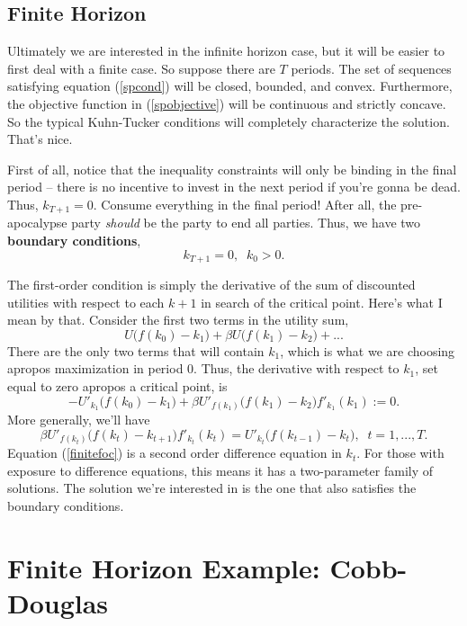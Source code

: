 \documentclass[12pt]{article}
\theoremstyle{definition}
\begin{document}
\subsection{Finite Horizon} 

Ultimately we are interested in the infinite horizon case, but it will be easier to first deal with a finite case. So suppose there are $T$ periods. 
The set of sequences satisfying equation (\ref{spcond}) will be closed, bounded, and convex. Furthermore, the objective function in (\ref{spobjective}) will be continuous and strictly concave. So the typical Kuhn-Tucker conditions will completely characterize the solution. That's nice. 

First of all, notice that the inequality constraints will only be binding in the final period -- there is no incentive to invest in the next period if you're gonna be dead. Thus, $k_{T+1}=0$. Consume everything in the final period! After all, the pre-apocalypse party \emph{should} be the party to end all parties. Thus, we have two \textbf{boundary conditions},
\begin{equation}
	k_{T+1}=0, \;\; k_0 >0.  \label{finitebc}
\end{equation}	
	
The first-order condition is simply the derivative of the sum of discounted utilities with respect to each $k+1$ in search of the critical point. Here's what I mean by that. Consider the first two terms in the utility sum,
	\[U\big( f(k_0) - k_{1} \big)	 + \beta U\big( f(k_1) - k_{2} \big) + ... \]
There are the only two terms that will contain $k_1$, which is what we are choosing apropos maximization in period 0. Thus, the derivative with respect to $k_1$, set equal to zero apropos a critical point, is 
	\[	
	-U'_{k_1}\big( f(k_0) - k_1 \big) 	+ \beta U'_{f(k_1)}\big( f(k_1) - k_2 \big)f'_{k_1}(k_1) :=0.
	\]
More generally, we'll have 
\begin{equation}
	 \beta U'_{f(k_t)}\big( f(k_t) - k_{t+1} \big) f'_{k_t}(k_t) = U'_{k_t} \big( f(k_{t-1}) - k_t \big) , \;\; t=1, ..., T. \label{finitefoc}
\end{equation}
Equation (\ref{finitefoc}) is a second order difference equation in $k_t$. For those with exposure to difference equations, this means it has a two-parameter family of solutions. The solution we're interested in is the one that also satisfies the boundary conditions. 



\section{Finite Horizon Example: Cobb-Douglas}
\end{document}
